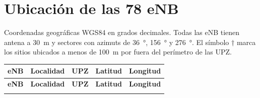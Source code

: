 \documentclass[11pt,letterpaper]{article}
\begin{document}
\newpage
\appendix
\section{Ubicación de las 78 eNB}
\label{anx:sitios}

Coordenadas geográficas WGS84 en grados decimales. Todas las eNB tienen antena a \SI{30}{m} y sectores con azimuts de \SI{36}{\degree}, \SI{156}{\degree} y \SI{276}{\degree}. El símbolo $\dagger$ marca los sitios ubicados a menos de \SI{100}{m} por fuera del perímetro de las UPZ.

{\small
{}
\begin{longtable}{@{}llllr@{}}
\toprule
\textbf{eNB} & \textbf{Localidad} & \textbf{UPZ} & \textbf{Latitud} & \textbf{Longitud} \\
\midrule
\endfirsthead
\toprule
\textbf{eNB} & \textbf{Localidad} & \textbf{UPZ} & \textbf{Latitud} & \textbf{Longitud} \\
\midrule
\endhead
\bottomrule
\endfoot

\end{longtable}
}
\end{document}

